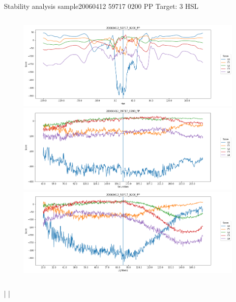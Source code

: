 \documentclass{beamer}
\begin{document}
\begin{frame}{Stability analysis sample}{20060412 59717 0200 PP Target: 3 HSL}
\begin{columns}
\begin{column}{0.45\textwidth}
\begin{figure}[p]
			\includegraphics[width=\textwidth]{chapter_stability/20060412_59717_0200_PP/h/scores.png}			\includegraphics[width=\textwidth]{chapter_stability/20060412_59717_0200_PP/s/scores.png}			\includegraphics[width=\textwidth]{chapter_stability/20060412_59717_0200_PP/l/scores.png}
		\end{figure}
	\end{column}
\end{columns}
\href{run:videos_stability/Messidor_20060412_59717_0200_PP_Target_3_Checking_Hue_Sensitivity.mp4}{\color{blue}{Hue}} | \href{run:videos_stability/Messidor_20060412_59717_0200_PP_Target_3_Checking_Saturation_Sensitivity.mp4}{\color{blue}{Saturation}} | \href{run:videos_stability/Messidor_20060412_59717_0200_PP_Target_3_Checking_Luminance_Sensitivity.mp4}{\color{blue}{Lightness}}
\end{frame}
\end{document}

